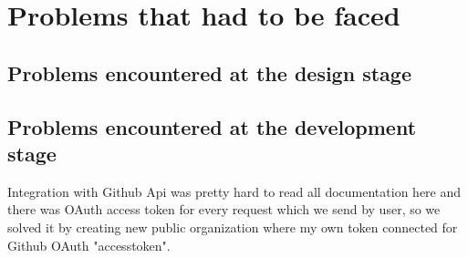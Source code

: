 \chapter{Problems that had to be faced}\label{ch:C}
\section{Problems encountered at the design stage}
\section{Problems encountered at the development stage}
Integration with Github Api was pretty hard to read all documentation here \cite{gitlink} and there was OAuth access token for every request which we send by user, so we solved it by creating new public organization where my own token connected for Github OAuth "accesstoken".


 
